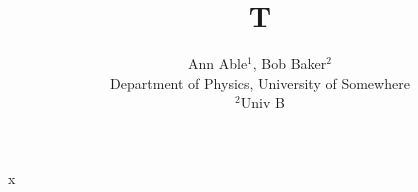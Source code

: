 \documentclass{article}
\title{T}
\author{Ann Able$^{1}$, Bob Baker$^{2}$\\ Department of Physics, University of Somewhere\\ $^{2}$Univ B}
\begin{document}
\maketitle
x
\end{document}
